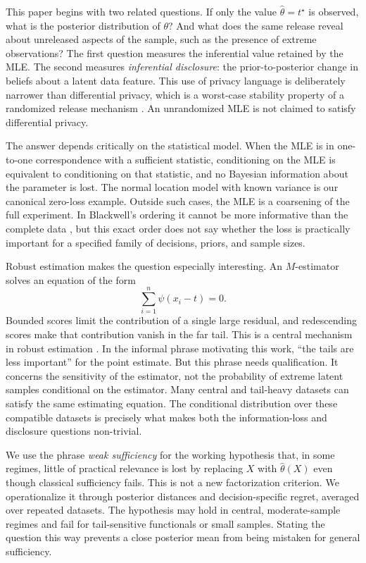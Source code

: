 \documentclass[smallextended,natbib,runningheads]{svjour3}
\begin{document}
This paper begins with two related questions.  If only the value
$\hat\theta=t^\star$ is observed, what is the posterior distribution of
$\theta$?  And what does the same release reveal about unreleased aspects of
the sample, such as the presence of extreme observations?  The first question
measures the inferential value retained by the MLE.  The second measures
\emph{inferential disclosure}: the prior-to-posterior change in beliefs about a
latent data feature.  This use of privacy language is deliberately narrower
than differential privacy, which is a worst-case stability property of a
randomized release mechanism \citep{dwork2006}.  An unrandomized MLE is not
claimed to satisfy differential privacy.

The answer depends critically on the statistical model.  When the MLE is in
one-to-one correspondence with a sufficient statistic, conditioning on the MLE
is equivalent to conditioning on that statistic, and no Bayesian information
about the parameter is lost.  The normal location model with known variance is
our canonical zero-loss example.  Outside such cases, the MLE is a
coarsening of the full experiment.  In Blackwell's ordering it cannot be more
informative than the complete data \citep{blackwell1953}, but this exact order
does not say whether the loss is practically important for a specified family
of decisions, priors, and sample sizes.

Robust estimation makes the question especially interesting.  An
$M$-estimator solves an equation of the form
\begin{equation}
  \sum_{i=1}^n \psi(x_i-t)=0.
  \label{eq:m_equation_intro}
\end{equation}
Bounded scores limit the contribution of a single large residual, and
redescending scores make that contribution vanish in the far tail.  This is a
central mechanism in robust estimation \citep{huber1964}.  In the informal
phrase motivating this work, ``the tails are less important'' for the point
estimate.  But this phrase needs qualification.  It concerns the sensitivity
of the estimator, not the probability of extreme latent samples conditional on
the estimator.  Many central and tail-heavy datasets can satisfy the same
estimating equation.  The conditional distribution over these compatible
datasets is precisely what makes both the information-loss and disclosure
questions non-trivial.

We use the phrase \emph{weak sufficiency} for the working hypothesis that, in
some regimes, little of practical relevance is lost by replacing $X$ with
$\hat\theta(X)$ even though classical sufficiency fails.  This is not a new
factorization criterion.  We operationalize it through posterior distances and
decision-specific regret, averaged over repeated datasets.  The hypothesis may
hold in central, moderate-sample regimes and fail for tail-sensitive
functionals or small samples.  Stating the question this way prevents a close
posterior mean from being mistaken for general sufficiency.
\end{document}
